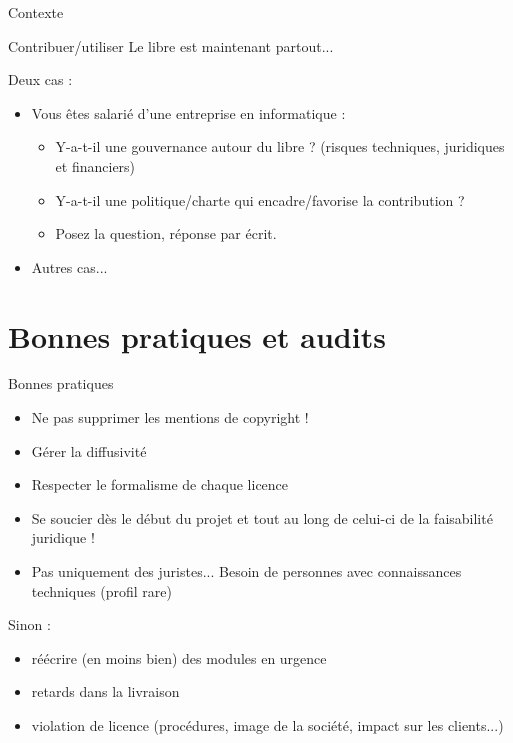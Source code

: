 \documentclass{beamer}
\begin{document}
\begin{frame}{Contexte}

  \begin{block}{Contribuer/utiliser}
    Le libre est maintenant partout...
  \end{block}
  Deux cas :
  \begin{itemize}
  \item Vous êtes salarié d'une entreprise en informatique :
    \begin{itemize}
    \item Y-a-t-il une gouvernance autour du libre ? (risques techniques, juridiques et financiers)
    \item Y-a-t-il une politique/charte qui encadre/favorise la contribution ?
    \item Posez la question, réponse par écrit.
    \end{itemize}
  \item Autres cas...
  \end{itemize}
  
\end{frame}


\section{Bonnes pratiques et audits}


\begin{frame}{Bonnes pratiques}
  \begin{itemize}
  \item Ne pas supprimer les mentions de copyright !
  \item Gérer la diffusivité
  \item Respecter le formalisme de chaque licence
  \item Se soucier dès le début du projet et tout au long de celui-ci de la faisabilité juridique !
  \item Pas uniquement des juristes... Besoin de personnes avec connaissances techniques (profil rare)
  \end{itemize}
Sinon :
\begin{itemize}
\item réécrire (en moins bien) des modules en urgence
\item retards dans la livraison
\item violation de licence (procédures, image de la société, impact sur les clients...)
\end{itemize}
\end{frame}
\end{document}
